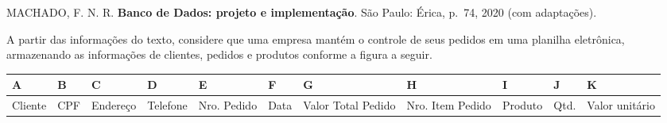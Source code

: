 \documentclass[
]{book}
\begin{document}
MACHADO, F. N. R. \textbf{Banco de Dados: projeto e implementação}. São Paulo: Érica, p.~74, 2020 (com adaptações).

A partir das informações do texto, considere que uma empresa mantém o controle de seus pedidos em uma planilha eletrônica, armazenando as informações de clientes, pedidos e produtos conforme a figura a seguir.

\begin{longtable}[]{@{}
  >{\raggedright\arraybackslash}p{}
  >{\raggedright\arraybackslash}p{}
  >{\raggedright\arraybackslash}p{}
  >{\raggedright\arraybackslash}p{}
  >{\raggedright\arraybackslash}p{}
  >{\raggedright\arraybackslash}p{}
  >{\raggedright\arraybackslash}p{}
  >{\raggedright\arraybackslash}p{}
  >{\raggedright\arraybackslash}p{}
  >{\raggedright\arraybackslash}p{}
  >{\raggedright\arraybackslash}p{}@{}}
\toprule\noalign{}
\begin{minipage}[b]{\linewidth}\raggedright
A
\end{minipage} & \begin{minipage}[b]{\linewidth}\raggedright
B
\end{minipage} & \begin{minipage}[b]{\linewidth}\raggedright
C
\end{minipage} & \begin{minipage}[b]{\linewidth}\raggedright
D
\end{minipage} & \begin{minipage}[b]{\linewidth}\raggedright
E
\end{minipage} & \begin{minipage}[b]{\linewidth}\raggedright
F
\end{minipage} & \begin{minipage}[b]{\linewidth}\raggedright
G
\end{minipage} & \begin{minipage}[b]{\linewidth}\raggedright
H
\end{minipage} & \begin{minipage}[b]{\linewidth}\raggedright
I
\end{minipage} & \begin{minipage}[b]{\linewidth}\raggedright
J
\end{minipage} & \begin{minipage}[b]{\linewidth}\raggedright
K
\end{minipage} \\
\midrule\noalign{}
\endhead
\bottomrule\noalign{}
\endlastfoot
Cliente & CPF & Endereço & Telefone & Nro. Pedido & Data & Valor Total Pedido & Nro. Item Pedido & Produto & Qtd. & Valor unitário \\
\end{longtable}
\end{document}

